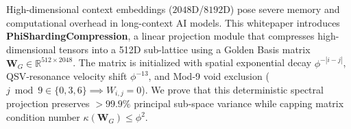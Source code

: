 \begin{abstractbox}
High-dimensional context embeddings ($2048$D/$8192$D) pose severe memory and computational overhead in long-context AI models. This whitepaper introduces \textbf{PhiShardingCompression}, a linear projection module that compresses high-dimensional tensors into a 512D sub-lattice using a Golden Basis matrix $\mathbf{W}_G \in \mathbb{R}^{512 \times 2048}$. The matrix is initialized with spatial exponential decay $\phi^{-|i-j|}$, QSV-resonance velocity shift $\phi^{-13}$, and Mod-9 void exclusion ($j \bmod 9 \in \{0,3,6\} \implies W_{i,j} = 0$). We prove that this deterministic spectral projection preserves $>99.9\%$ principal sub-space variance while capping matrix condition number $\kappa(\mathbf{W}_G) \le \phi^2$.
\end{abstractbox}